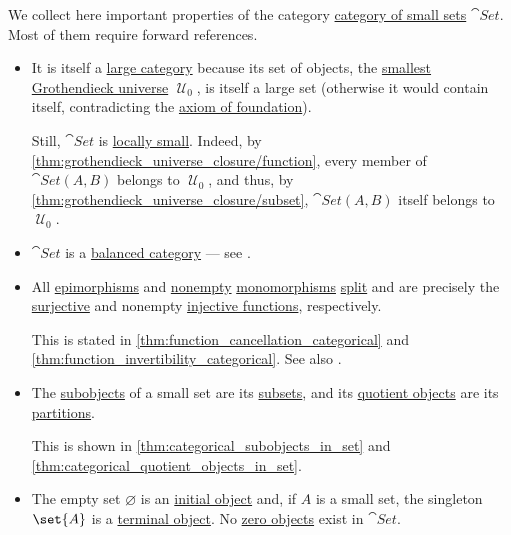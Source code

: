 \begin{remark}\label{rem:category_of_small_sets}
  We collect here important properties of the category \hyperref[def:category_of_small_sets]{category of small sets} \( \cat{Set} \). Most of them require forward references.

  \begin{itemize}
    \item It is itself a \hyperref[def:small_category]{large category} because its set of objects, the \hyperref[def:smallest_grothendieck_universe]{smallest Grothendieck universe} \( \mscrU_0 \), is itself a large set (otherwise it would contain itself, contradicting the \hyperref[def:zfc/foundation]{axiom of foundation}).

    Still, \( \cat{Set} \) is \hyperref[def:small_category]{locally small}. Indeed, by \cref{thm:grothendieck_universe_closure/function}, every member of \( \cat{Set}(A, B) \) belongs to \( \mscrU_0 \), and thus, by \cref{thm:grothendieck_universe_closure/subset}, \( \cat{Set}(A, B) \) itself belongs to \( \mscrU_0 \).

    \item \( \cat{Set} \) is a \hyperref[def:balanced_category]{balanced category} --- see .

    \item All \hyperref[def:morphism_cancellation/right]{epimorphisms} and \hyperref[def:set_valued_function/empty]{nonempty} \hyperref[def:morphism_cancellation/left]{monomorphisms} \hyperref[def:morphism_invertibility/left]{split} and are precisely the \hyperref[def:function_invertibility/surjective]{surjective} and nonempty \hyperref[def:function_invertibility/injective]{injective functions}, respectively.

    This is stated in \cref{thm:function_cancellation_categorical} and \cref{thm:function_invertibility_categorical}. See also .

    \item The \hyperref[def:categorical_subobject]{subobjects} of a small set are its \hyperref[def:subset]{subsets}, and its \hyperref[def:categorical_quotient_object]{quotient objects} are its \hyperref[def:set_partition]{partitions}.

    This is shown in \cref{thm:categorical_subobjects_in_set} and \cref{thm:categorical_quotient_objects_in_set}.

    \item The empty set \( \varnothing \) is an \hyperref[def:universal_objects/initial]{initial object} and, if \( A \) is a small set, the singleton \( \set{ A } \) is a \hyperref[def:universal_objects/terminal]{terminal object}. No \hyperref[def:universal_objects/zero]{zero objects} exist in \( \cat{Set} \).


\end{itemize}
\end{remark}
